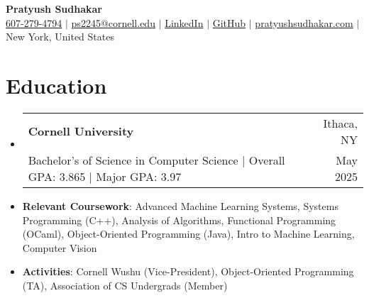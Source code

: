 \documentclass[letterpaper,10pt]{article}
\makeatletter
\newcommand{\resumeItem}[1]{
  \item\small{
    {#1 \vspace{-2.5pt}}
  }
}
\newcommand{\education}[4]{
  \vspace{-3pt}\item
    \begin{tabular*}{0.97\textwidth}[t]{@{}l@{\extracolsep{\fill}}r@{}}
      \textbf{#1} & #2 \\
      \small#3 & \small #4 \\
    \end{tabular*}\vspace{-3pt}
}
\newcommand{\resumeSubHeadingListStart}{\begin{itemize}[leftmargin=0.15in, label={}]}
\newcommand{\resumeSubHeadingListEnd}{\end{itemize}}
\makeatother
\begin{document}

\begin{center}
  \vspace*{-1cm}
  \textbf{\huge  Pratyush Sudhakar} \\ \vspace{1pt}
  \href{tel:+1 (607) 279-4794}{\small 607-279-4794} $|$ \href{mailto:ps2245@cornell.edu}{{ps2245@cornell.edu}} $|$
  \href{https://linkedin.com/in/pratyushsudhakar}{{LinkedIn}} $|$
  \href{https://github.com/pratyush1712}{GitHub} $|$
  \href{https://pratyushsudhakar.com/}{pratyushsudhakar.com}
  $|$
  {New York, United States}
\end{center}


\section{Education}
\resumeSubHeadingListStart
\education
{Cornell University}{Ithaca, NY}
{Bachelor's of Science in Computer Science $|$ Overall GPA: 3.865 $|$ Major GPA: 3.97}{May 2025}
\resumeItem{\textbf{Relevant Coursework}: Advanced Machine Learning Systems, Systems Programming (C++), Analysis of Algorithms, Functional Programming (OCaml), Object-Oriented Programming (Java), Intro to Machine Learning, Computer Vision}
\resumeItem{\textbf{Activities}: Cornell Wushu (Vice-President), Object-Oriented Programming (TA), Association of CS Undergrads (Member)}
\resumeSubHeadingListEnd

\end{document}
